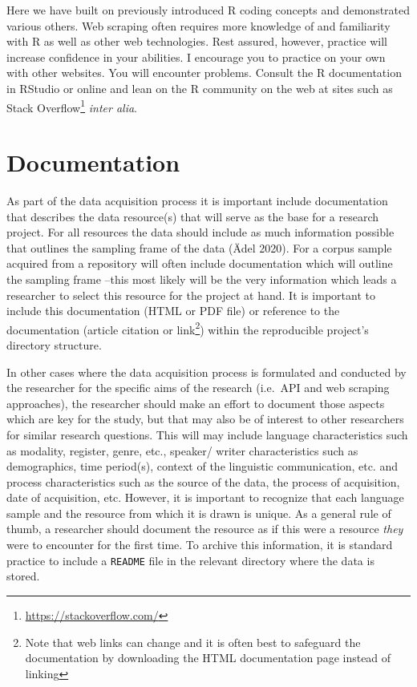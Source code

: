 \documentclass[
  letterpaper,
]{scrbook}
\DeclareRobustCommand{\href}[2]{#2\footnote{\url{#1}}}
\begin{document}
Here we have built on previously introduced R coding concepts and
demonstrated various others. Web scraping often requires more knowledge
of and familiarity with R as well as other web technologies. Rest
assured, however, practice will increase confidence in your abilities. I
encourage you to practice on your own with other websites. You will
encounter problems. Consult the R documentation in RStudio or online and
lean on the R community on the web at sites such as
\href{https://stackoverflow.com/}{Stack Overflow} \emph{inter alia}.

\hypertarget{documentation-1}{%
\section{Documentation}\label{documentation-1}}

As part of the data acquisition process it is important include
documentation that describes the data resource(s) that will serve as the
base for a research project. For all resources the data should include
as much information possible that outlines the sampling frame of the
data (Ädel 2020). For a corpus sample acquired from a repository will
often include documentation which will outline the sampling frame --this
most likely will be the very information which leads a researcher to
select this resource for the project at hand. It is important to include
this documentation (HTML or PDF file) or reference to the documentation
(article citation or link\footnote{Note that web links can change and it
  is often best to safeguard the documentation by downloading the HTML
  documentation page instead of linking}) within the reproducible
project's directory structure.

In other cases where the data acquisition process is formulated and
conducted by the researcher for the specific aims of the research
(i.e.~API and web scraping approaches), the researcher should make an
effort to document those aspects which are key for the study, but that
may also be of interest to other researchers for similar research
questions. This will may include language characteristics such as
modality, register, genre, etc., speaker/ writer characteristics such as
demographics, time period(s), context of the linguistic communication,
etc. and process characteristics such as the source of the data, the
process of acquisition, date of acquisition, etc. However, it is
important to recognize that each language sample and the resource from
which it is drawn is unique. As a general rule of thumb, a researcher
should document the resource as if this were a resource \emph{they} were
to encounter for the first time. To archive this information, it is
standard practice to include a \texttt{README} file in the relevant
directory where the data is stored.
\end{document}
